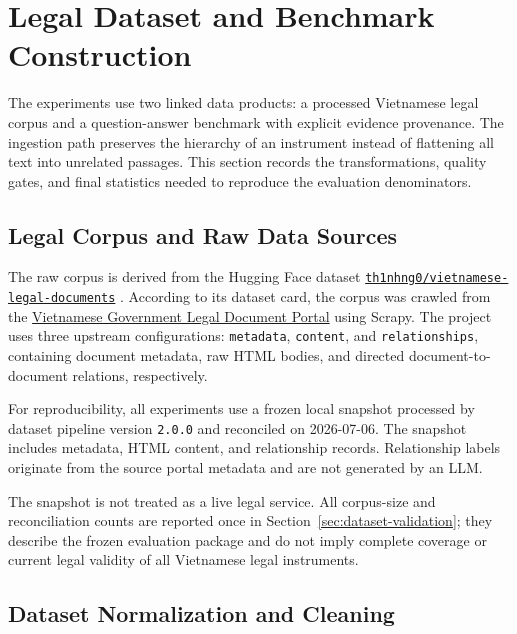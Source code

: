 \section{Legal Dataset and Benchmark Construction}
\label{sec:dataset-construction}

The experiments use two linked data products: a processed Vietnamese legal
corpus and a question-answer benchmark with explicit evidence provenance. The
ingestion path preserves the hierarchy of an instrument instead of flattening
all text into unrelated passages. This section records the transformations,
quality gates, and final statistics needed to reproduce the evaluation
denominators.

\subsection{Legal Corpus and Raw Data Sources}
\label{sec:raw-corpus}

The raw corpus is derived from the Hugging Face dataset
\href{https://huggingface.co/datasets/th1nhng0/vietnamese-legal-documents}
{\texttt{th1nhng0/vietnamese-legal-documents}}
\citep{ngo2026vietnameselegal}. According to its dataset card, the corpus was crawled from the
\href{https://vbpl.vn}{Vietnamese Government Legal Document Portal}
using Scrapy. The project uses three upstream configurations:
\texttt{metadata}, \texttt{content}, and \texttt{relationships}, containing document metadata, raw HTML bodies, and directed document-to-document relations, respectively.

For reproducibility, all experiments use a frozen local snapshot processed by dataset pipeline version \texttt{2.0.0} and reconciled on 2026-07-06. The snapshot includes metadata, HTML content, and relationship records. Relationship labels originate from the source portal metadata and are not generated by an LLM.

The snapshot is not treated as a live legal service. All corpus-size and reconciliation counts are reported once in Section~\ref{sec:dataset-validation}; they describe the frozen evaluation package and do not imply complete coverage or current legal validity of all Vietnamese legal instruments.

\subsection{Dataset Normalization and Cleaning}
\label{sec:dataset-normalization}

